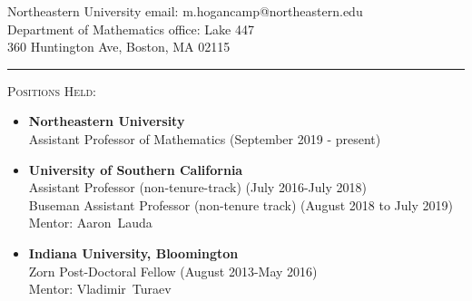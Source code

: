 \documentclass[12pt]{amsart}
\renewcommand{\j}{\indent}
\renewcommand{\v}{\vskip5pt }
\newcommand{\newitem}[1]{\noindent\textsc{#1:}\vskip5pt  }
\newcommand{\lm}{1em}
\newcommand{\ii}{0pt}
\begin{document}
%
\thispagestyle{empty}
\vskip5pt
\noindent

\noindent
Northeastern University \hfill  email: m.hogancamp@northeastern.edu\\
Department of  Mathematics  \hfill  office: Lake 447\\
360 Huntington Ave, Boston, MA 02115  \vskip 4pt



\hrule
\vskip14pt



\newitem{Positions Held}

\begin{itemize}[leftmargin=\lm,itemindent=\ii]
\item[$\cdot$]\textbf{Northeastern University}\\ 
Assistant Professor of Mathematics (September 2019 - present)\v

\item[$\cdot$]\textbf{University of Southern California}\\
Assistant Professor (non-tenure-track) (July 2016-July 2018)\\
Buseman Assistant Professor (non-tenure track) (August 2018 to July 2019)\\
Mentor: Aaron~Lauda \v

\item[$\cdot$]\textbf{Indiana University, Bloomington}\\
Zorn Post-Doctoral Fellow (August 2013-May 2016)\\
Mentor: Vladimir~Turaev \v
\end{itemize}
\end{document}
